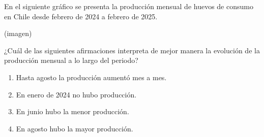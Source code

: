 \begin{problem}
    En el siguiente gráfico se presenta la producción mensual de huevos de consumo en Chile desde febrero de 2024 a febrero de 2025.

    \begin{center}
    (imagen)
    \end{center}

    ¿Cuál de las siguientes afirmaciones interpreta de mejor manera la evolución de la producción mensual a lo largo del periodo?

    \begin{enumerate}[label=\Alph*.]
        \item Hasta agosto la producción aumentó mes a mes.
        \item En enero de 2024 no hubo producción.
        \item En junio hubo la menor producción.
        \item En agosto hubo la mayor producción.
    \end{enumerate}
\end{problem}
